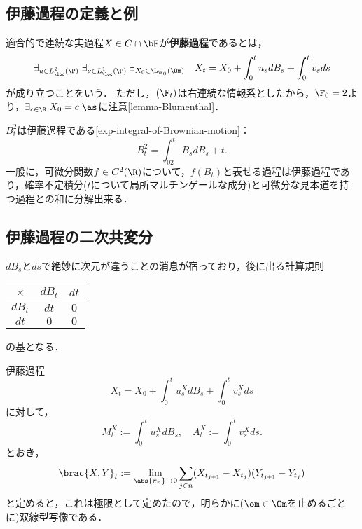 \documentclass[uplatex,dvipdfmx]{jsreport}
\begin{document}
\subsection{伊藤過程の定義と例}

\begin{definition}
    適合的で連続な実過程$X\in C\cap\bF$が\textbf{伊藤過程}であるとは，
    \[\exists_{u\in L^2_\loc(\P)}\;\exists_{\nu\in L^1_\loc(\P)}\;\exists_{X_0\in\L_{\F_0}(\Om)}\quad X_t=X_0+\int^t_0u_sdB_s+\int^t_0v_sds\]
    が成り立つことをいう．
    ただし，$(\F_t)$は右連続な情報系としたから，$\F_0=2$より，$\exists_{c\in\R}\;X_0=c\;\as$に注意\ref{lemma-Blumenthal}．
\end{definition}

\begin{example}
    $B^2_t$は伊藤過程である\ref{exp-integral-of-Brownian-motion}：
    \[B^2_t=\int^t_02B_sdB_s+t.\]
    一般に，可微分関数$f\in C^2(\R)$について，$f(B_t)$と表せる過程は伊藤過程であり，確率不定積分($t$について局所マルチンゲールな成分)と可微分な見本道を持つ過程との和に分解出来る．
\end{example}

\subsection{伊藤過程の二次共変分}

\begin{tcolorbox}[colframe=ForestGreen, colback=ForestGreen!10!white,breakable,colbacktitle=ForestGreen!40!white,coltitle=black,fonttitle=\bfseries\sffamily,
title=]
    $dB_s$と$ds$で絶妙に次元が違うことの消息が宿っており，後に出る計算規則
    \begin{center}
    \begin{tabular}{c|cc}\hline
    $\times$&$dB_t$&$dt$\\\hline
    $dB_t$&$dt$&$0$\\
    $dt$&$0$&$0$\\\hline
    \end{tabular}
    \end{center}
    の基となる．
\end{tcolorbox}

\begin{notation}[共変分]
    伊藤過程
    \[X_t=X_0+\int^t_0u^X_sdB_s+\int^t_0v_s^Xds\]
    に対して，
    \[M^X_t:=\int^t_0u^X_sdB_s,\quad A^X_t:=\int^t_0v^X_sds.\]
    とおき，
    \[\brac{X,Y}_t:=\lim_{\abs{\pi_n}\to0}\sum_{j\in n}(X_{t_{j+1}}-X_{t_j})(Y_{t_{j+1}}-Y_{t_j})\]
    と定めると，これは極限として定めたので，明らかに($\om\in\Om$を止めるごとに)双線型写像である．
\end{notation}
\end{document}
